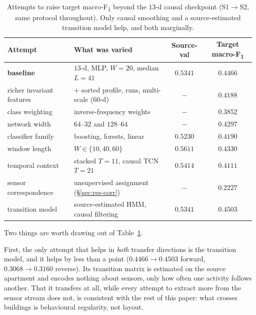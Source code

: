 \documentclass[a4paper,fleqn]{cas-dc}
\newcommand{\macf}{macro-F\textsubscript{1}}
\begin{document}
\begin{table}[t]
\centering
\caption{Attempts to raise target \macf{} beyond the $13$-d causal checkpoint
(S1$\to$S2, same protocol throughout). Only causal smoothing and a source-estimated
transition model help, and both marginally.}
\label{tab:ceiling}
\small
\begin{tabular}{llcc}
\toprule
Attempt & What was varied & Source-val & Target \macf \\
\midrule
\textbf{baseline} & $13$-d, MLP, $W{=}20$, median $L{=}41$ & $0.5341$ & $\mathbf{0.4466}$ \\
\midrule
richer invariant features & $+$ sorted profile, runs, multi-scale ($60$-d) & $-$ & $0.4188$ \\
class weighting           & inverse-frequency weights          & $-$ & $0.3852$ \\
network width             & $64$--$32$ and $128$--$64$         & $-$ & $0.4297$ \\
classifier family         & boosting, forests, linear          & $0.5230$ & $0.4190$ \\
window length             & $W\in\{10,40,60\}$                 & $0.5611$ & $0.4330$ \\
temporal context          & stacked $T{=}11$, causal TCN $T{=}21$ & $0.5414$ & $0.4111$ \\
sensor correspondence     & unsupervised assignment (\S\ref{sec:res-corr}) & $-$ & $0.2227$ \\
\midrule
transition model          & source-estimated HMM, causal filtering & $0.5341$ & $0.4503$ \\
\bottomrule
\end{tabular}
\end{table}

Two things are worth drawing out of Table~\ref{tab:ceiling}.

First, the only attempt that helps in \emph{both} transfer directions is the transition
model, and it helps by less than a point ($0.4466\to0.4503$ forward, $0.3068\to0.3160$
reverse). Its transition matrix is estimated on the source apartment and encodes nothing
about sensors, only how often one activity follows another. That it transfers at all,
while every attempt to extract more from the sensor stream does not, is consistent with
the rest of this paper: what crosses buildings is behavioural regularity, not layout.
\end{document}
